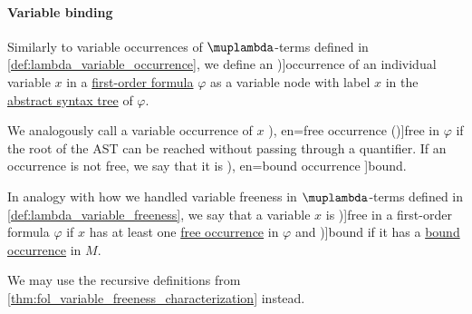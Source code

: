 \paragraph{Variable binding}

\begin{definition}\label{def:fol_variable_occurrence}\mimprovised
  Similarly to variable occurrences of \( \muplambda \)-terms defined in \cref{def:lambda_variable_occurrence}, we define an \term[en=occurrence (\cite[63]{VanDalen2004LogicAndStructure})]{occurrence} of an individual variable \( x \) in a \hyperref[def:fol_formula]{first-order formula} \( \varphi \) as a variable node with label \( x \) in the \hyperref[def:fol_formula_ast]{abstract syntax tree} of \( \varphi \).

  We analogously call a variable occurrence of \( x \) \term[ru=свободное (вхождение) (\cite[88]{Герасимов2014Вычислимость}), en=free occurrence (\cite[13]{Shoenfield1967MathematicalLogic})]{free} in \( \varphi \) if the root of the AST can be reached without passing through a quantifier. If an occurrence is not free, we say that it is \term[ru=связоное (вхождение) (\cite[88]{Герасимов2014Вычислимость}), en=bound occurrence \cite[13]{Shoenfield1967MathematicalLogic}]{bound}.
\end{definition}

\begin{definition}\label{def:fol_variable_freeness}
  In analogy with how we handled variable freeness in \( \muplambda \)-terms defined in \cref{def:lambda_variable_freeness}, we say that a variable \( x \) is \term[ru=свободная (переменная), en=free (variable) (\cite[16]{Shoenfield1967MathematicalLogic})]{free} in a first-order formula \( \varphi \) if \( x \) has at least one \hyperref[def:fol_variable_occurrence]{free occurrence} in \( \varphi \) and \term[ru=связанная (переменная), en=bound (variable) (\cite[16]{Shoenfield1967MathematicalLogic})]{bound} if it has a \hyperref[def:lambda_variable_occurrence]{bound occurrence} in \( M \).
\end{definition}
\begin{comments}
  \item We may use the recursive definitions from \cref{thm:fol_variable_freeness_characterization} instead.
\end{comments}


